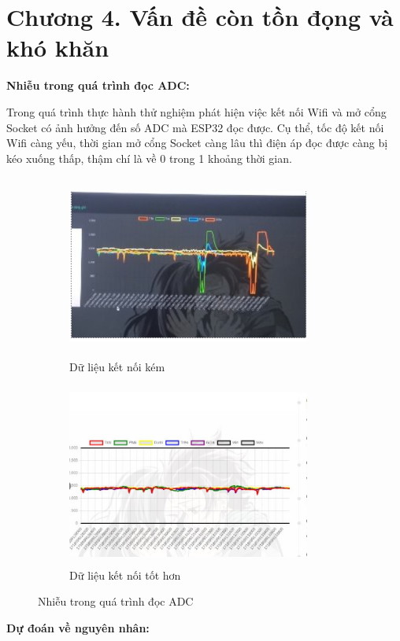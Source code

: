 \documentclass{article}
\begin{document}
\section*{Chương 4. Vấn đề còn tồn đọng và khó khăn}
\setcounter{section}{4}
\setcounter{subsection}{0}
\textbf{Nhiễu trong quá trình đọc ADC:}

Trong quá trình thực hành thử nghiệm phát hiện việc kết nối Wifi và mở cổng Socket có ảnh hưởng đến số ADC mà ESP32 đọc được. Cụ thể, tốc độ kết nối Wifi càng yếu, thời gian mở cổng Socket càng lâu thì điện áp đọc được càng bị kéo xuống thấp, thậm chí là về 0 trong 1 khoảng thời gian.

\begin{figure}[H]
    \centering
    \begin{subfigure}[b]{0.45\textwidth}
        \centering
        \includegraphics[width=8cm,height=6cm]{image/anh19.png}
        \caption{Dữ liệu kết nối kém} \label{EV1}
    \end{subfigure}
    \hfill
    \begin{subfigure}[b]{0.45\textwidth}
        \centering
        \includegraphics[width=8cm,height=6cm]{image/anh20.png}
        \caption{Dữ liệu kết nối tốt hơn} \label{EV2}
    \end{subfigure}
    \caption{Nhiễu trong quá trình đọc ADC}
    \label{fig:two_graphs}
\end{figure}
\textbf{Dự đoán về nguyên nhân:\\}
\end{document}
